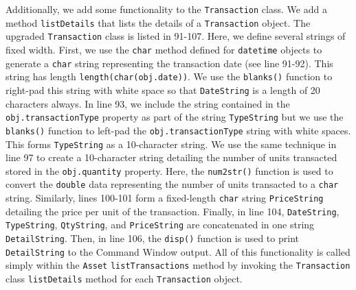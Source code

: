 Additionally, we add some functionality to the \texttt{Transaction} class. We add a method \texttt{listDetails} that lists the details of a \texttt{Transaction} object. The upgraded \texttt{Transaction} class is listed in 91-107. Here, we define several strings of fixed width. First, we use the \texttt{char} method defined for \texttt{datetime} objects to generate a \texttt{char} string representing the transaction date (see line 91-92). This string has length \verb!length(char(obj.date))!. We use the \texttt{blanks()} function to right-pad this string with white space so that \texttt{DateString} is a length of 20 characters always.  In line 93, we include the string contained in the \texttt{obj.transactionType} property as part of the string \texttt{TypeString} but we use the \texttt{blanks()} function to left-pad the \texttt{obj.transactionType} string with white spaces. This forms \texttt{TypeString} as a 10-character string. We use the same technique in line 97 to create a 10-character string detailing the number of units transacted stored in the \texttt{obj.quantity} property. Here, the \texttt{num2str()} function is used to convert the \texttt{double} data representing the number of units transacted to a \texttt{char} string. Similarly, lines 100-101 form a fixed-length \texttt{char} string \texttt{PriceString} detailing the price per unit of the transaction. Finally, in line 104, \texttt{DateString}, \texttt{TypeString}, \texttt{QtyString}, and \texttt{PriceString} are concatenated in one string \texttt{DetailString}. Then, in line 106, the \texttt{disp()} function is used to print \texttt{DetailString} to the Command Window output. All of this functionality is called simply within the \texttt{Asset} \texttt{listTransactions} method by invoking the \texttt{Transaction} class \texttt{listDetails} method for each \texttt{Transaction} object.

